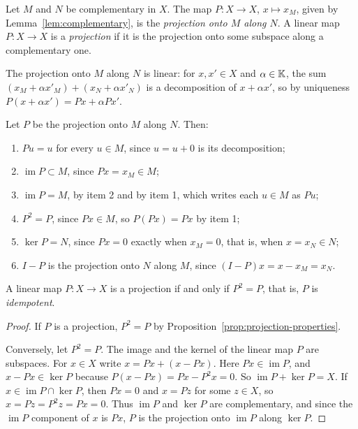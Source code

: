 \begin{definition}[Projection]\label{def:projection}
Let $M$ and $N$ be complementary in $X$. The map $P \colon X \to X$,
$x \mapsto x_M$, given by Lemma~\ref{lem:complementary}, is the
\emph{projection onto $M$ along $N$}. A linear map $P \colon X \to X$ is a
\emph{projection} if it is the projection onto some subspace along a
complementary one.
\end{definition}

\begin{remark}
The projection onto $M$ along $N$ is linear: for $x, x' \in X$ and
$\alpha \in \mathbb{K}$, the sum $(x_M + \alpha x'_M) + (x_N + \alpha x'_N)$ is a
decomposition of $x + \alpha x'$, so by uniqueness
$P(x + \alpha x') = Px + \alpha P x'$.
\end{remark}

\begin{proposition}\label{prop:projection-properties}
Let $P$ be the projection onto $M$ along $N$. Then:
\begin{enumerate}
  \item $Pu = u$ for every $u \in M$, since $u = u + 0$ is its
    decomposition;
  \item $\operatorname{im} P \subset M$, since $Px = x_M \in M$;
  \item $\operatorname{im} P = M$, by item 2 and by item 1, which writes each
    $u \in M$ as $Pu$;
  \item $P^2 = P$, since $Px \in M$, so $P(Px) = Px$ by item 1;
  \item $\ker P = N$, since $Px = 0$ exactly when $x_M = 0$, that is, when
    $x = x_N \in N$;
  \item $I - P$ is the projection onto $N$ along $M$, since
    $(I - P)x = x - x_M = x_N$.
\end{enumerate}
\end{proposition}

\begin{proposition}\label{prop:idempotent}
A linear map $P \colon X \to X$ is a projection if and only if $P^2 = P$,
that is, $P$ is \emph{idempotent}.
\end{proposition}

\begin{proof}
If $P$ is a projection, $P^2 = P$ by
Proposition~\ref{prop:projection-properties}.

Conversely, let $P^2 = P$. The image and the kernel of the linear map $P$ are
subspaces. For $x \in X$ write $x = Px + (x - Px)$. Here
$Px \in \operatorname{im} P$, and $x - Px \in \ker P$ because
$P(x - Px) = Px - P^2 x = 0$. So $\operatorname{im} P + \ker P = X$. If
$x \in \operatorname{im} P \cap \ker P$, then $Px = 0$ and $x = Pz$ for some
$z \in X$, so $x = Pz = P^2 z = Px = 0$. Thus $\operatorname{im} P$ and
$\ker P$ are complementary, and since the $\operatorname{im} P$ component of
$x$ is $Px$, $P$ is the projection onto $\operatorname{im} P$ along
$\ker P$.
\end{proof}

